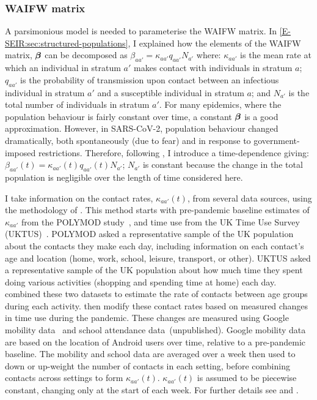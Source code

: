 \documentclass[thesis.tex]{subfiles}
\begin{document}
\subsubsection{WAIFW matrix} \label{SEIR:sec:WAIFW-application}

A parsimonious model is needed to parameterise the WAIFW matrix.
In \cref{E-SEIR:sec:structured-populations}, I explained how the elements of the WAIFW matrix, $\bm{\beta}$ can be decomposed as $\beta_{aa'} = \kappa_{aa'} q_{aa'} N_{a'}$ where: $\kappa_{aa'}$ is the mean rate at which an individual in stratum $a'$ makes contact with individuals in stratum $a$; $q_{aa'}$ is the probability of transmission upon contact between an infectious individual in stratum $a'$ and a susceptible individual in stratum $a$; and $N_{a'}$ is the total number of individuals in stratum $a'$.
For many epidemics, where the population behaviour is fairly constant over time, a constant $\bm{\beta}$ is a good approximation.
However, in SARS-CoV-2, population behaviour changed dramatically, both spontaneously (\eg due to fear) and in response to government-imposed restrictions.
Therefore, following \textcite{birrellRealtime}, I introduce a time-dependence giving: $\beta_{aa'}(t) = \kappa_{aa'}(t) q_{aa'}(t) N_{a'}$; $N_{a'}$ is constant because the change in the total population is negligible over the length of time considered here.

I take information on the contact rates, $\kappa_{aa'}(t)$, from several data sources, using the methodology of \textcite{vanleeuwenTime,vanleeuwenAugmenting}.
This method starts with pre-pandemic baseline estimates of $\kappa_{aa'}$ from the POLYMOD study~\autocite{mossongSocial}, and time use from the UK Time Use Survey (UKTUS)~\autocite{UKTUS}.
POLYMOD asked a representative sample of the UK population about the contacts they make each day, including information on each contact's age and location (home, work, school, leisure, transport, or other).
UKTUS asked a representative sample of the UK population about how much time they spent doing various activities (\eg shopping and spending time at home) each day.
\Textcite{vanleeuwenAugmenting} combined these two datasets to estimate the rate of contacts between age groups during each activity.
\Textcite{birrellRealtime} then modify these contact rates based on measured changes in time use during the pandemic.
These changes are measured using Google mobility data~\autocite{googleCOVID19} and school attendance data~(unpublished).
Google mobility data are based on the location of Android users over time, relative to a pre-pandemic baseline.
The mobility and school data are averaged over a week then used to down or up-weight the number of contacts in each setting, before combining contacts across settings to form $\kappa_{aa'}(t)$.
$\kappa_{aa'}(t)$ is assumed to be piecewise constant, changing only at the start of each week.
For further details see \textcite{vanleeuwenAugmenting} and \textcite[supplementary material]{birrellRealtime}.
\end{document}
